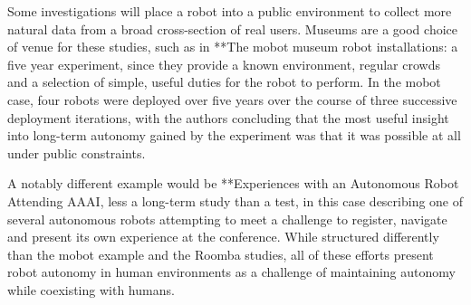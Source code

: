 \documentclass{sfuthesis}
\begin{document}
Some investigations will place a robot into a public environment to collect more natural data from a broad cross-section of real users. Museums are a good choice of venue for these studies, such as in **The mobot museum robot installations: a five year experiment, since they provide a known environment, regular crowds and a selection of simple, useful duties for the robot to perform. In the mobot case, four robots were deployed over five years over the course of three successive deployment iterations, with the authors concluding that the most useful insight into long-term autonomy gained by the experiment was that it was possible at all under public constraints. 

A notably different example would be **Experiences with an Autonomous Robot Attending AAAI, less a long-term study than a test, in this case describing one of several autonomous robots attempting to meet a challenge to register, navigate and present its own experience at the conference. While structured differently than the mobot example and the Roomba studies, all of these efforts present robot autonomy in human environments as a challenge of maintaining autonomy while coexisting with humans.









\end{document}
